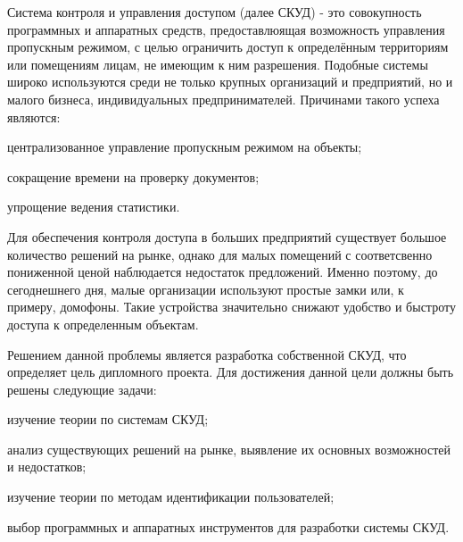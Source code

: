 
Система контроля и управления доступом \cite{access_control} (далее СКУД) - это совокупность
программных и аппаратных средств, предоставлюящая возможность управления пропускным режимом, с целью ограничить доступ к определённым территориям или помещениям лицам, не имеющим к ним разрешения. Подобные системы широко используются среди не только крупных организаций и предприятий, но и малого бизнеса, индивидуальных предпринимателей. Причинами такого успеха являются:

\begin{itemize*}
\item централизованное управление пропускным режимом на объекты;
\item сокращение времени на проверку документов;
\item упрощение ведения статистики.
\end{itemize*}

Для обеспечения контроля доступа в больших предприятий существует большое количество решений на рынке, однако для малых помещений с соответсвенно пониженной ценой наблюдается недостаток предложений. Именно поэтому, до сегоднешнего дня, малые организации используют простые замки или, к примеру, домофоны. Такие устройства значительно снижают удобство и быстроту доступа к определенным объектам. 

Решением данной проблемы является разработка собственной СКУД, что определяет цель дипломного проекта. Для достижения данной цели должны быть решены следующие задачи:

\begin{itemize*}
\item изучение теории по системам СКУД;
\item анализ существующих решений на рынке, выявление их основных возможностей и недостатков;
\item изучение теории по методам идентификации пользователей;
\item выбор программных и аппаратных инструментов для разработки системы СКУД.
\end{itemize*}
